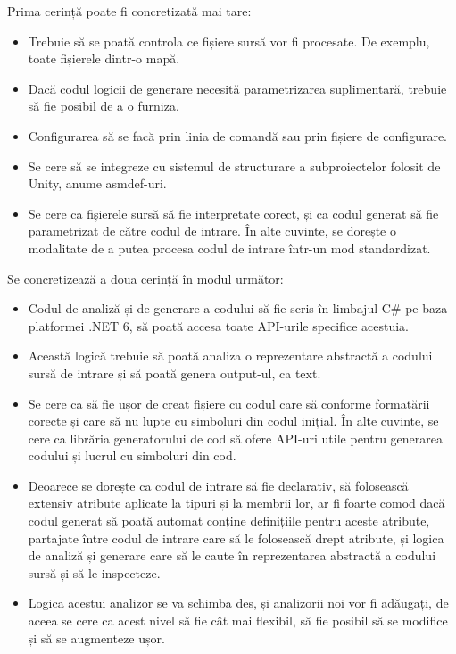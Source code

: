 \documentclass[a4paper,12pt]{report}
\begin{document}
Prima cerință poate fi concretizată mai tare:

\begin{itemize}
  \item Trebuie să se poată controla ce fișiere sursă vor fi procesate. De exemplu, toate fișierele dintr-o mapă.
  \item Dacă codul logicii de generare necesită parametrizarea suplimentară, trebuie să fie posibil de a o furniza.
  \item Configurarea să se facă prin linia de comandă sau prin fișiere de configurare.
  \item Se cere să se integreze cu sistemul de structurare a subproiectelor folosit de Unity, anume asmdef-uri.
  \item Se cere ca fișierele sursă să fie interpretate corect, și ca codul generat să fie parametrizat de către codul de intrare. În alte cuvinte, se dorește o modalitate de a putea procesa codul de intrare într-un mod standardizat.
\end{itemize}


Se concretizează a doua cerință în modul următor:

\begin{itemize}
  \item Codul de analiză și de generare a codului să fie scris în limbajul C\# pe baza platformei {{.}NET} 6, să poată accesa toate \ac{API}-urile specifice acestuia.
  \item Această logică trebuie să poată analiza o reprezentare abstractă a codului sursă de intrare și să poată genera output-ul, ca text.
  \item Se cere ca să fie ușor de creat fișiere cu codul care să conforme formatării corecte și care să nu lupte cu simboluri din codul inițial.
  În alte cuvinte, se cere ca librăria generatorului de cod să ofere \ac{API}-uri utile pentru generarea codului și lucrul cu simboluri din cod.
  \item Deoarece se dorește ca codul de intrare să fie declarativ, să folosească extensiv atribute aplicate la tipuri și la membrii lor, ar fi foarte
  comod dacă codul generat să poată automat conține definițiile pentru aceste atribute, partajate între codul de intrare care să le folosească drept atribute,
  și logica de analiză și generare care să le caute în reprezentarea abstractă a codului sursă și să le inspecteze.
  \item Logica acestui analizor se va schimba des, și analizorii noi vor fi adăugați, de aceea se cere ca acest nivel să fie cât mai flexibil, să fie posibil să se modifice și să se augmenteze ușor.
\end{itemize}
\end{document}
